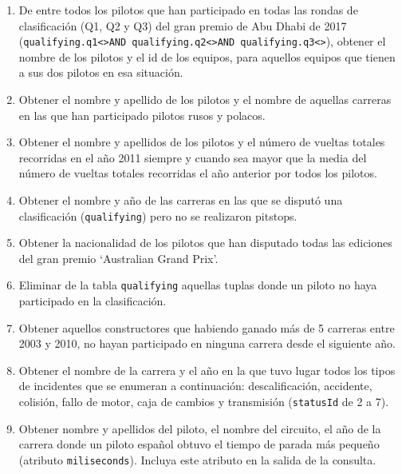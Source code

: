 \documentclass{db-practice}
\begin{document}
\begin{enumerate}
    \item De entre todos los pilotos que han participado en todas las rondas de clasificación (Q1, Q2 y Q3) del gran premio de Abu Dhabi de 2017 (\texttt{qualifying.q1<>\textquotesingle\textquotesingle AND qualifying.q2<>\textquotesingle\textquotesingle AND qualifying.q3<>\textquotesingle\textquotesingle}), obtener el nombre de los pilotos y el id de los equipos, para aquellos equipos que tienen a sus dos pilotos en esa situación.
    
    \item Obtener el nombre y apellido de los pilotos y el nombre de aquellas carreras en las que han participado pilotos rusos y polacos.
            
    \item Obtener el nombre y apellidos de los pilotos y el número de vueltas totales recorridas en el año 2011 siempre y cuando sea mayor que la media del número de vueltas totales recorridas el año anterior por todos los pilotos.

    \item Obtener el nombre y año de las carreras en las que se disputó una clasificación (\texttt{qualifying}) pero no se realizaron pitstops.
    
    \item Obtener la nacionalidad de los pilotos que han disputado todas las ediciones del gran premio `Australian Grand Prix'.
    
    \item Eliminar de la tabla \texttt{qualifying} aquellas tuplas donde un piloto no haya participado en la clasificación.
            
    \item Obtener aquellos constructores que habiendo ganado más de 5 carreras entre 2003 y 2010, no hayan participado en ninguna carrera desde el siguiente año.
    
    \item Obtener el nombre de la carrera y el año en la que tuvo lugar todos los tipos de incidentes que se enumeran a continuación: descalificación, accidente, colisión, fallo de motor, caja de cambios y transmisión (\texttt{statusId} de 2 a 7).
    
    \item Obtener nombre y apellidos del piloto, el nombre del circuito, el año de la carrera donde un piloto español obtuvo el tiempo de parada más pequeño (atributo \texttt{miliseconds}). Incluya este atributo en la salida de la consulta.


\end{enumerate}
\end{document}
